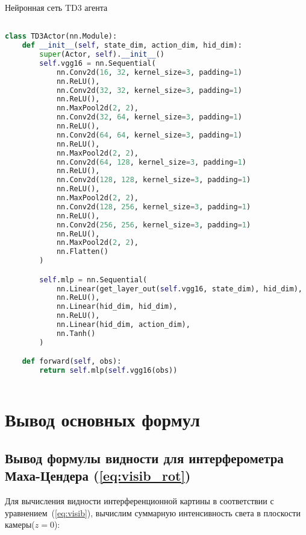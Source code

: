\begin{ListingEnv}[!h]
\captiondelim{ }
\caption{Нейронная сеть TD3 агента}\label{lst:td3}

\begin{lstlisting}[language=Python]

class TD3Actor(nn.Module):
    def __init__(self, state_dim, action_dim, hid_dim):
        super(Actor, self).__init__()
        self.vgg16 = nn.Sequential(
            nn.Conv2d(16, 32, kernel_size=3, padding=1)
            nn.ReLU(),
            nn.Conv2d(32, 32, kernel_size=3, padding=1)
            nn.ReLU(),
            nn.MaxPool2d(2, 2), 
            nn.Conv2d(32, 64, kernel_size=3, padding=1)
            nn.ReLU(),
            nn.Conv2d(64, 64, kernel_size=3, padding=1)
            nn.ReLU(),
            nn.MaxPool2d(2, 2), 
            nn.Conv2d(64, 128, kernel_size=3, padding=1)
            nn.ReLU(),
            nn.Conv2d(128, 128, kernel_size=3, padding=1)
            nn.ReLU(),
            nn.MaxPool2d(2, 2), 
            nn.Conv2d(128, 256, kernel_size=3, padding=1)
            nn.ReLU(),
            nn.Conv2d(256, 256, kernel_size=3, padding=1)
            nn.ReLU(),
            nn.MaxPool2d(2, 2),
            nn.Flatten()
        )

        self.mlp = nn.Sequential(
            nn.Linear(get_layer_out(self.vgg16, state_dim), hid_dim),
            nn.ReLU(),
            nn.Linear(hid_dim, hid_dim),
            nn.ReLU(),
            nn.Linear(hid_dim, action_dim),
            nn.Tanh()
        )

    def forward(self, obs):
        return self.mlp(self.vgg16(obs))
        
\end{lstlisting}
\end{ListingEnv}    


\chapter{Вывод основных формул}\label{app:B}

\section{Вывод формулы видности для интерферометра Маха-Цендера (\ref{eq:visib_rot})}\label{app:B1}

Для вычисления видности интерференционной картины в соответствии с уравнением~(\ref{eq:visib}), вычислим суммарную интенсивность света в плоскости камеры($z=0$):

